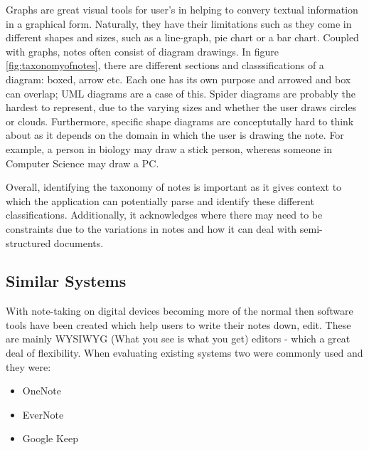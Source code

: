 Graphs are great visual tools for user's in helping to convery textual information in a graphical form. Naturally, they have their limitations such as they come in different shapes and sizes, such as a line-graph, pie chart or a bar chart. Coupled with graphs, notes often consist of diagram drawings.  In figure \ref{fig:taxonomyofnotes}, there are different sections and classsifications of a diagram: boxed, arrow etc. Each one has its own purpose and arrowed and box can overlap; UML diagrams are a case of this. Spider diagrams are probably the hardest to represent, due to the varying sizes and whether the user draws circles or clouds. Furthermore, specific shape diagrams are conceptutally hard to think about as it depends on the domain in which the user is drawing the note. For example, a person in biology may draw a stick person, whereas someone in Computer Science may draw a PC. 

Overall, identifying the taxonomy of notes is important as it gives context to which the application can potentially parse and identify these different classifications. Additionally, it acknowledges where there may need to be constraints due to the variations in notes and how it can deal with semi-structured documents.




\subsection{Similar Systems}
With note-taking on digital devices becoming more of the normal then software tools have been created which help users to write their notes down, edit. These are mainly WYSIWYG (What you see is what you get) editors - which a great deal of flexibility. When evaluating existing systems two were commonly used and they were: 
\begin{itemize}
  \item OneNote
  \item EverNote
  \item Google Keep
\end{itemize}

